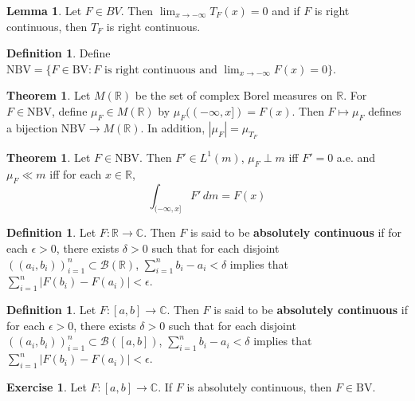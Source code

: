 \documentclass{book}
\theoremstyle{definition}
\newtheorem{defn}[definition]{Definition}
\newtheorem{thm}[definition]{Theorem}
\newtheorem{lem}[definition]{Lemma}
\newtheorem{ex}[definition]{Exercise}
\newcommand{\del}{\delta}
\newcommand{\ep}{\epsilon}
\newcommand{\C}{\mathbb{C}}
\newcommand{\R}{\mathbb{R}}
\newcommand{\MB}{\mathcal{B}}
\newcommand{\lex}[1]{\label{ex:#1}}
\newcommand{\ld}[1]{\label{defn:#1}}
\DeclareMathOperator*{\0}{\mbf{0}}
\DeclareMathOperator*{\1}{\mbf{1}}
\newcommand{\dm}{\, d m}
\newcommand{\BV}{\text{BV}}
\newcommand{\NBV}{\text{NBV}}
\begin{document}
	\begin{lem}
		Let $F \in BV$. Then $\lim_{x \rightarrow -\infty}T_F(x)=0$ and if $F$ is right continuous, then $T_F$ is right continuous.
	\end{lem}
	
	\begin{defn} \ld{00000} 
		Define $\NBV=\{F \in \BV: F \text{ is right continuous and }\lim_{x \rightarrow -\infty}F(x)=0\}$.
	\end{defn}
	
	\begin{thm}
		Let $M(\R)$ be the set of complex Borel measures on $\R$. For $F \in \NBV$, define $\mu_F \in M(\R)$ by $\mu_F((-\infty, x]) = F(x)$. Then $F \mapsto \mu_F$ defines a bijection $\NBV \rightarrow M(\R)$. In addition, $|\mu_F| = \mu_{T_F}$
	\end{thm}
	
	\begin{thm}
		Let $F \in \NBV$. Then $F' \in L^1(m)$, $\mu_F \perp m$ iff $F' =0$ a.e. and $\mu_F \ll m$ iff for each $x \in \R$, $$\int_{(-\infty, x]}F'\dm = F(x)$$
	\end{thm}
	
	\begin{defn} \ld{00000} 
		Let $F: \R \rightarrow \C$. Then $F$ is said to be \textbf{absolutely continuous} if for each $\ep>0$, there exists $\del>0$ such that for each disjoint $((a_i, b_i))_{i=1}^n \subset \MB(\R)$, $\sum_{i=1}^n b_i-a_i < \del$ implies that $\sum_{i=1}^n|F(b_i)-F(a_i)| < \ep$.
	\end{defn}
	
	\begin{defn} \ld{00000} 
		Let $F: [a,b] \rightarrow \C$. Then $F$ is said to be \textbf{absolutely continuous} if for each $\ep>0$, there exists $\del>0$ such that for each disjoint $((a_i, b_i))_{i=1}^n \subset \MB([a,b])$, $\sum_{i=1}^n b_i-a_i < \del$ implies that $\sum_{i=1}^n|F(b_i)-F(a_i)| < \ep$.
	\end{defn}
	
	\begin{ex} \lex{00000} 
		Let $F:[a,b] \rightarrow \C$. If $F$ is absolutely continuous, then $F \in \BV$.
	\end{ex}
	
\end{document}
